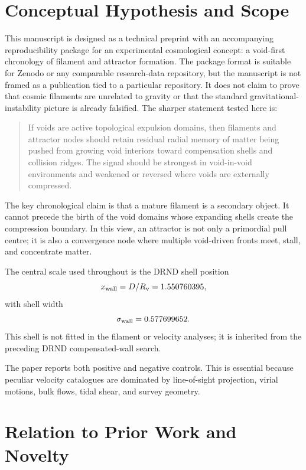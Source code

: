 \documentclass[11pt,a4paper]{article}
\begin{document}
\section{Conceptual Hypothesis and Scope}

This manuscript is designed as a technical preprint with an accompanying reproducibility package for an experimental cosmological concept: a void-first chronology of filament and attractor formation. The package format is suitable for Zenodo or any comparable research-data repository, but the manuscript is not framed as a publication tied to a particular repository. It does not claim to prove that cosmic filaments are unrelated to gravity or that the standard gravitational-instability picture is already falsified. The sharper statement tested here is:

\begin{quote}
If voids are active topological expulsion domains, then filaments and attractor nodes should retain residual radial memory of matter being pushed from growing void interiors toward compensation shells and collision ridges. The signal should be strongest in void-in-void environments and weakened or reversed where voids are externally compressed.
\end{quote}

The key chronological claim is that a mature filament is a secondary object. It cannot precede the birth of the void domains whose expanding shells create the compression boundary. In this view, an attractor is not only a primordial pull centre; it is also a convergence node where multiple void-driven fronts meet, stall, and concentrate matter.

The central scale used throughout is the DRND shell position
\begin{equation}
x_{\rm wall}=D/R_{\rm v}=1.550760395,
\end{equation}
with shell width
\begin{equation}
\sigma_{\rm wall}=0.577699652.
\end{equation}
This shell is not fitted in the filament or velocity analyses; it is inherited from the preceding DRND compensated-wall search.

The paper reports both positive and negative controls. This is essential because peculiar velocity catalogues are dominated by line-of-sight projection, virial motions, bulk flows, tidal shear, and survey geometry.

\section{Relation to Prior Work and Novelty}
\end{document}
